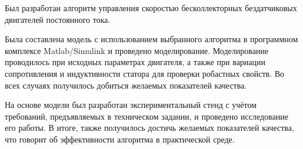 \Conclusion %
\thispagestyle{empty}

Был разработан алгоритм управления скоростью бесколлекторных бездатчиковых двигателей постоянного тока. 

Была составлена модель с использованием выбранного алгоритма в программном комплексе Matlab/Simulink и проведено моделирование. Моделирование проводилось при исходных параметрах двигателя, а также при вариации сопротивления и индуктивности статора для проверки робастных свойств. Во всех случаях получилось добиться желаемых показателей качества.

На основе модели был разработан экспериментальный стенд с учётом требований, предъявляемых в техническом задании, и проведено исследование его работы. В итоге, также получилось достичь желаемых показателей качества, что говорит об эффективности алгоритма в практической среде.

